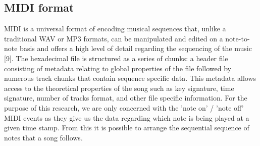 \documentclass[12pt]{article}
\begin{document}
\subsection*{MIDI format}
  \begin{flushright}
    \begin{minipage}[t]{0.96\linewidth}
      MIDI is a universal format of encoding musical sequences that, unlike a traditional WAV or MP3 formats, can be manipulated and edited on a note-to-note basis and offers a high level of detail regarding the sequencing of the music [9]. The hexadecimal file is structured as a series of chunks: a header file consisting of metadata relating to global properties of the file followed by numerous track chunks that contain sequence specific data. This metadata allows access to the theoretical properties of the song such as key signature, time signature, number of tracks format, and other file specific information. For the purpose of this research, we are only concerned with the 'note on' / 'note off' MIDI events as they give us the data regarding which note is being played at a given time stamp. From this it is possible to arrange the sequential sequence of notes that a song follows.
    \end{minipage}
  \end{flushright}
\end{document}
